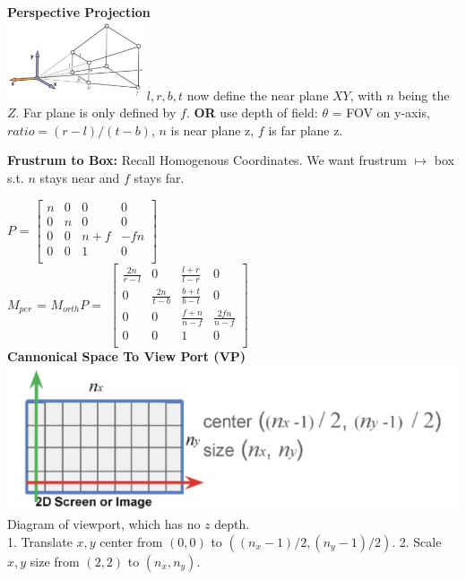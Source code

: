 \documentclass[letterpaper, 8pt]{extarticle}
\begin{document}
\begin{multicols*}{4}
\textbf{Perspective Projection}\\
\includegraphics[width=4cm]{cam-persp.png}
$l,r,b,t$ now define the near plane $XY$, with $n$ being the $Z$. Far plane is only defined by $f$.
\textbf{OR} use depth of field:
$\theta$ = FOV on y-axis, $ratio = (r-l)/(t-b)$, $n$ is near plane z, $f$ is far plane z.

\textbf{Frustrum to Box:}
Recall Homogenous Coordinates. We want frustrum $\mapsto$ box s.t. $n$ stays near and $f$ stays far.

$P$ =
\(
\begin{bmatrix}
    n & 0 & 0   & 0   \\
    0 & n & 0   & 0   \\
    0 & 0 & n+f & -fn \\
    0 & 0 & 1   & 0   \\
\end{bmatrix}
\)\\
$M_{per}$ = $M_{orth}P =$
\(
\begin{bmatrix}
    \frac{2n}{r-l} & 0              & \frac{l+r}{l-r} & 0               \\
    0              & \frac{2n}{t-b} & \frac{b+t}{b-t} & 0               \\
    0              & 0              & \frac{f+n}{n-f} & \frac{2fn}{n-f} \\
    0              & 0              & 1               & 0               \\
\end{bmatrix}
\)\\

\textbf{Cannonical Space To View Port (VP)}\\

\includegraphics[width=\linewidth]{viewport-diagram.png}
Diagram of viewport, which has no $z$ depth.\\
1. Translate $x,y$ center from $(0,0)$ to $((n_x-1)/2, (n_y-1)/2)$.
2. Scale $x,y$ size from $(2,2)$ to $(n_x, n_y)$.


\end{multicols*}
\end{document}
